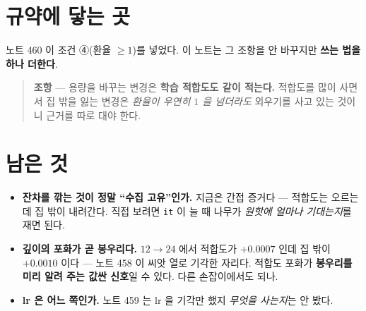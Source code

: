 \documentclass[11pt]{article}
\begin{document}
\section{규약에 닿는 곳}

노트 460 이 조건 ④(환율 $\ge 1$)를 넣었다. 이 노트는 그 조항을
안 바꾸지만 \textbf{쓰는 법을 하나 더한다}.

\begin{quote}
\textbf{조항} --- 용량을 바꾸는 변경은 \textbf{학습 적합도도 같이 적는다.}
적합도를 많이 사면서 집 밖을 잃는 변경은 \emph{환율이 우연히 $1$ 을
넘더라도} 외우기를 사고 있는 것이니 근거를 따로 대야 한다.
\end{quote}

\section*{남은 것}

\begin{itemize}
\item \textbf{잔차를 깎는 것이 정말 ``수집 고유''인가.} 지금은 간접
증거다 --- 적합도는 오르는데 집 밖이 내려간다. 직접 보려면 \texttt{it}
이 늘 때 나무가 \emph{원핫에 얼마나 기대는지}를 재면 된다.
\item \textbf{깊이의 포화가 곧 봉우리다.} $12 \to 24$ 에서 적합도가
$+0.0007$ 인데 집 밖이 $+0.0010$ 이다 --- 노트 458 이 씨앗 열로 기각한
자리다. 적합도 포화가 \textbf{봉우리를 미리 알려 주는 값싼 신호}일 수
있다. 다른 손잡이에서도 되나.
\item \textbf{lr 은 어느 쪽인가.} 노트 459 는 lr 을 기각만 했지
\emph{무엇을 사는지}는 안 봤다.
\end{itemize}
\end{document}
